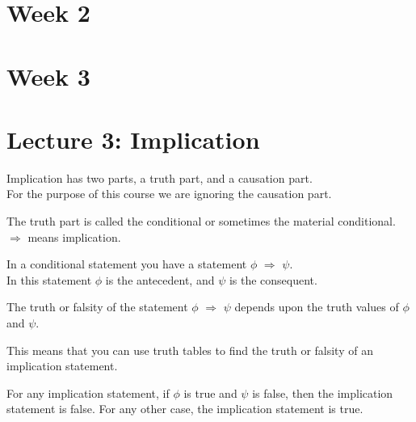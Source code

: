 \documentclass[]{article}
\begin{document}
\section{Week 2}

\section{Week 3}
	\section{Lecture 3: Implication}
	
		\begin{center}
			
				Implication has two parts, a truth part, and a causation part.\\ 
				For the purpose of this course we are ignoring the causation part.\\
				\begin{framed}
					The truth part is called the conditional or sometimes the material conditional.\\
								$\Rightarrow$ means implication.\\
				\end{framed}
			
				In a conditional statement you have a statement $\phi$ $\Rightarrow$ $\psi$.\\
				In this statement $\phi$ is the antecedent, and $\psi$ is the consequent.\\
				\begin{framed}
				The truth or falsity of the statement $\phi$ $\Rightarrow$ $\psi$ depends upon the truth values of $\phi$ and $\psi$.\\
				\end{framed}
				
				This means that you can use truth tables to find the truth or falsity of an implication statement.
				\begin{framed}
				For any implication statement, if $ \phi $ is true and $ \psi $ is false, then the implication statement is false. For any other case, the implication statement is true.
				\end{framed}
				
				
		
		\end{center}
\end{document}
